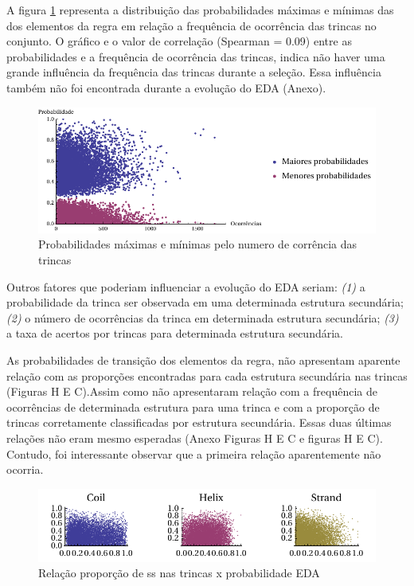 A figura \ref{fig:probG999_occXprob} representa a distribuição das probabilidades máximas e mínimas das dos elementos da regra em relação a frequência de ocorrência das trincas no conjunto. O gráfico e o valor de correlação (Spearman = 0.09) entre as probabilidades e a frequência de ocorrência das trincas,  indica não haver uma grande influência da frequência das trincas durante a seleção. Essa influência também não foi encontrada durante a evolução do EDA (Anexo).  

\begin{figure}
  \centering
  \includegraphics[width=1\textwidth]{figures/probG999_occXprob.pdf}
  \caption{Probabilidades máximas e mínimas pelo numero de corrência das trincas}
        \label{fig:probG999_occXprob}
\end{figure}


Outros fatores que poderiam influenciar a evolução do EDA seriam: \textit{(1)} a probabilidade da trinca ser observada em uma determinada estrutura secundária; \textit{(2)} o número de ocorrências da trinca em determinada estrutura secundária; \textit{(3)} a taxa de acertos por trincas para determinada estrutura secundária.     

As probabilidades de transição dos elementos da regra, não apresentam aparente relação com as proporções encontradas para cada estrutura secundária nas trincas (Figuras H E C).Assim como não apresentaram relação com a frequência de ocorrências de determinada estrutura para uma trinca e com a proporção de trincas corretamente classificadas por estrutura secundária. Essas duas últimas relações não eram mesmo esperadas (Anexo Figuras H E C e figuras H E C). Contudo, foi interessante observar que a primeira relação aparentemente não ocorria. 

\begin{figure}
  \centering
  \includegraphics[width=1\textwidth]{figures/relacao_prob_propss.pdf}
  \caption{Relação proporção de ss nas trincas x probabilidade EDA}
        \label{fig:relacao_prob_propss}
\end{figure}

